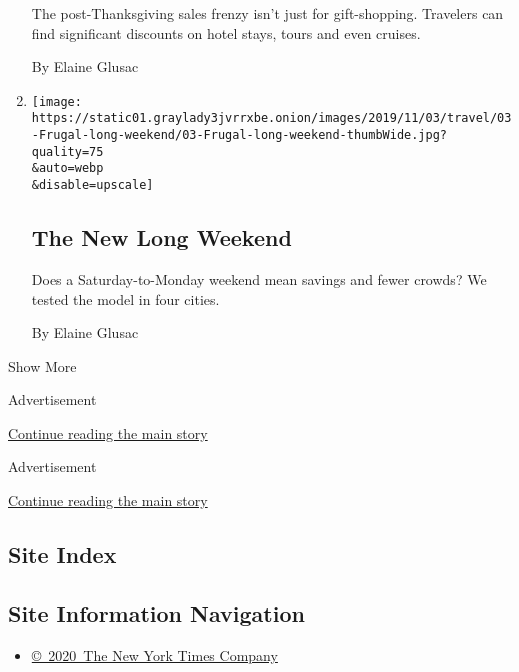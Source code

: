 \begin{enumerate}
  The post-Thanksgiving sales frenzy isn't just for gift-shopping.
  Travelers can find significant discounts on hotel stays, tours and
  even cruises.

  By Elaine Glusac
\item
  \href{/2019/11/01/travel/weekend-trips.html}{}

  \texttt{[image: https://static01.graylady3jvrrxbe.onion/images/2019/11/03/travel/03-Frugal-long-weekend/03-Frugal-long-weekend-thumbWide.jpg?quality=75\\\&auto=webp\\\&disable=upscale]}

  \hypertarget{the-new-long-weekend}{%
  \subsection{The New Long Weekend}\label{the-new-long-weekend}}

  Does a Saturday-to-Monday weekend mean savings and fewer crowds? We
  tested the model in four cities.

  By Elaine Glusac
\end{enumerate}

Show More

Advertisement

\protect\hyperlink{after-mid1}{Continue reading the main story}

Advertisement

\protect\hyperlink{after-mktg}{Continue reading the main story}

\hypertarget{site-index}{%
\subsection{Site Index}\label{site-index}}

\hypertarget{site-information-navigation}{%
\subsection{Site Information
Navigation}\label{site-information-navigation}}

\begin{itemize}
\tightlist
\item
  \href{https://help.nytimes3xbfgragh.onion/hc/en-us/articles/115014792127-Copyright-notice}{©~2020~The
  New York Times Company}
\end{itemize}

